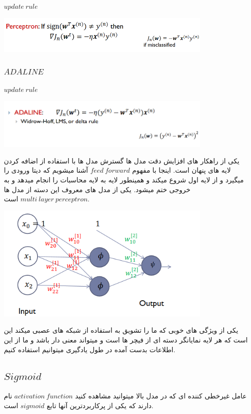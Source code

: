 \documentclass[12pt]{article}
\begin{document}
$update\:rule$

\includegraphics[width= 0.8\textwidth]{figs/perceptron_update_rule.png}


\subsubsection*{$ADALINE$}
$update\:rule$


\includegraphics[width= 0.8\textwidth]{figs/adaline_update_rule.png}


یکی از راهکار های افزایش دقت مدل ها گسترش مدل ها با استفاده از اضافه کردن لایه های پنهان است.
اینجا با مفهوم 
$feed\:forward$
آشنا میشویم که دیتا ورودی را میگیرد و از لایه اول شروع میکند و همینطور لایه به لایه محاسبات را انجام میدهد و به خروجی ختم میشود. یکی از مدل های معروف این دسته از مدل ها 
$multi\:layer\:perceptron$
است.

\includegraphics[width= 0.8\textwidth]{figs/MLP.png}


یکی از ویژگی های خوبی که ما را تشویق به استفاده از شبکه های عصبی میکند این است که هر لایه نمایانگر دسته ای از فیچر ها است و میتواند معنی دار باشد و ما از این اطلاعات بدست آمده در طول یادگیری میتوانیم استفاده کنیم.

\subsection*{$Sigmoid$}
عامل غیرخطی کننده ای که در مدل بالا میتوانید مشاهده کنید 
$activation\:function$
نام دارند که یکی از پرکاربردترین آنها تابع 
$sigmoid$
است.
\end{document}
